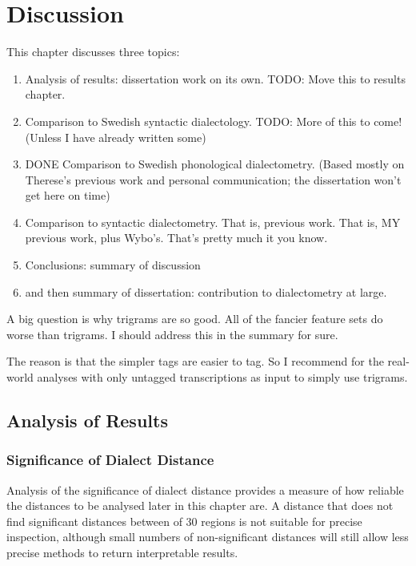 \chapter{Discussion}

This chapter discusses three topics:

\begin{enumerate}
\item Analysis of results: dissertation work on its own.
TODO: Move this to results chapter.
\item Comparison to Swedish syntactic dialectology.
TODO: More of this to come! (Unless I have already written some)
\item DONE Comparison to Swedish phonological dialectometry. (Based mostly
  on Therese's previous work and personal communication; the
  dissertation won't get here on time)
\item Comparison to syntactic dialectometry.
  That is, previous work. That is, MY previous work, plus
  Wybo's. That's pretty much it you know.
\item Conclusions: summary of discussion
\item and then summary of dissertation: contribution to dialectometry at large.
\end{enumerate}

A big question is why trigrams are so good. All of the fancier feature
sets do worse than trigrams. I should address this in the summary for
sure.

The reason is that the simpler tags are easier to tag. So I recommend
for the real-world analyses with only untagged transcriptions as input
to simply use trigrams.

\section{Analysis of Results}


\subsection{Significance of Dialect Distance}

Analysis of the significance of dialect distance provides a measure of
how reliable the distances to be analysed later in this chapter are. A
distance that does not find significant distances between of 30
regions is not suitable for precise inspection, although small numbers
of non-significant distances will still allow less precise methods to
return interpretable results.

